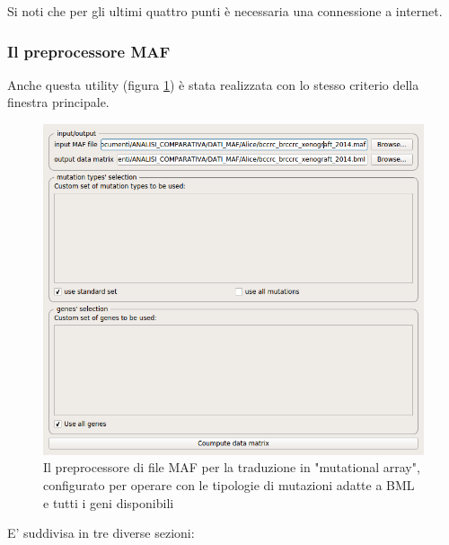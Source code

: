 \documentclass[a4paper]{article}
\begin{document}
	Si noti che per gli ultimi quattro punti è necessaria una connessione a internet.  

	\subsubsection{Il preprocessore MAF}

	Anche questa utility (figura \ref{fig:BMLMAFPreprocessor}) è stata realizzata con lo stesso criterio della finestra principale. 

	\begin{figure}[h]
	  \centering
	  \includegraphics[scale=0.43, keepaspectratio]{BMLMAFPreprocessor.png}%
	  \captionsetup{justification=centering,margin=0.5cm}
	  \caption{Il preprocessore di file MAF per la traduzione in "mutational array", configurato per operare con le tipologie di
	mutazioni adatte a BML e tutti i geni disponibili } \label{fig:BMLMAFPreprocessor}
	\end{figure}

	E' suddivisa in tre diverse sezioni: 
\end{document}
